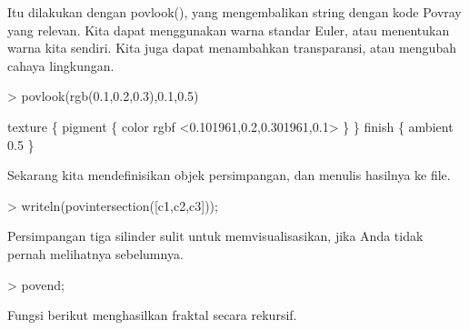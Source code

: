 \documentclass[a4paper,10pt]{article}
\begin{document}
\begin{eulernotebook}
\begin{eulercomment}
\begin{eulercomment}
\begin{eulercomment}
Itu dilakukan dengan povlook(), yang mengembalikan string dengan kode
Povray yang relevan. Kita dapat menggunakan warna standar Euler, atau
menentukan warna kita sendiri. Kita juga dapat menambahkan
transparansi, atau mengubah cahaya lingkungan.
\end{eulercomment}
\begin{eulerprompt}
> povlook(rgb(0.1,0.2,0.3),0.1,0.5)
\end{eulerprompt}
\begin{euleroutput}
   texture \{ pigment \{ color rgbf <0.101961,0.2,0.301961,0.1> \}  \} 
   finish \{ ambient 0.5 \} 
  
\end{euleroutput}
\begin{eulercomment}
Sekarang kita mendefinisikan objek persimpangan, dan menulis hasilnya
ke file.
\end{eulercomment}
\begin{eulerprompt}
> writeln(povintersection([c1,c2,c3]));
\end{eulerprompt}
\begin{eulercomment}
Persimpangan tiga silinder sulit untuk memvisualisasikan, jika Anda
tidak pernah melihatnya sebelumnya.
\end{eulercomment}
\begin{eulerprompt}
> povend;
\end{eulerprompt}
\begin{eulercomment}
Fungsi berikut menghasilkan fraktal secara rekursif.


\end{eulercomment}
\end{eulercomment}
\end{eulercomment}
\end{eulernotebook}
\end{document}
